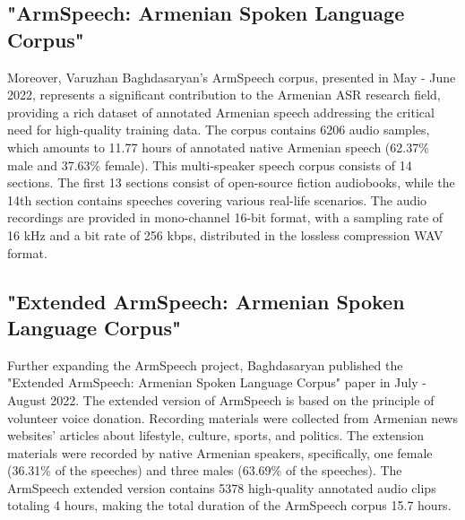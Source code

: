 \documentclass[conference]{IEEEtran}
\begin{document}
\subsection{"ArmSpeech: Armenian Spoken Language Corpus" \cite{Melikian2022ArmSpeechAS}}
Moreover, Varuzhan Baghdasaryan's ArmSpeech corpus, presented in May - June 2022, represents a significant contribution to the Armenian ASR research field, providing a rich dataset of annotated Armenian speech addressing the critical need for high-quality training data. The corpus contains 6206 audio samples, which amounts to 11.77 hours of annotated native Armenian speech (62.37\% male and 37.63\% female). This multi-speaker speech corpus consists of 14 sections. The first 13 sections consist of open-source fiction audiobooks, while the 14th section contains speeches covering various real-life scenarios. The audio recordings are provided in mono-channel 16-bit format, with a sampling rate of 16 kHz and a bit rate of 256 kbps, distributed in the lossless compression WAV format. 

\subsection{"Extended ArmSpeech: Armenian Spoken Language Corpus" \cite{Baghdasaryan2022ExtendedAA}}
Further expanding the ArmSpeech project, Baghdasaryan published the "Extended ArmSpeech: Armenian Spoken Language Corpus" paper in July - August 2022. The extended version of ArmSpeech is based on the principle of volunteer voice donation. Recording materials were collected from Armenian news websites' articles about lifestyle, culture, sports, and politics. The extension materials were recorded by native Armenian speakers, specifically, one female (36.31\% of the speeches) and three males (63.69\% of the speeches). The ArmSpeech extended version contains 5378 high-quality annotated audio clips totaling 4 hours, making the total duration of the ArmSpeech corpus 15.7 hours.
\end{document}
